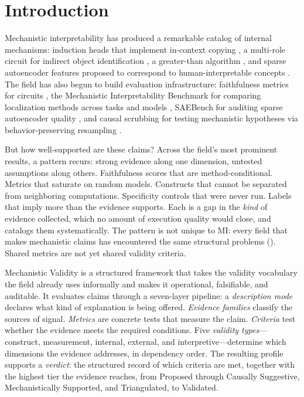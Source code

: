 \documentclass{article}
\begin{document}
\newpage
{\small\setlength{\parskip}{0pt}\setcounter{tocdepth}{3}\tableofcontents}
\newpage

\section{Introduction}
\label{sec:intro}

Mechanistic interpretability has produced a remarkable catalog of internal mechanisms:
induction heads that implement in-context copying \citep{olsson2022context}, a multi-role
circuit for indirect object identification \citep{wang2023interpretability}, a greater-than
algorithm \citep{hanna2023greater}, and sparse autoencoder features proposed to correspond
to human-interpretable concepts \citep{cunningham2024sparse, bricken2023monosemanticity}. The field has also begun to
build evaluation infrastructure: faithfulness metrics for circuits
\citep{miller2024transformer}, the Mechanistic Interpretability Benchmark for comparing
localization methods across tasks and models \citep{mueller2025mib}, SAEBench for auditing
sparse autoencoder quality \citep{karvonen2025saebench}, and causal scrubbing for testing
mechanistic hypotheses via behavior-preserving resampling \citep{chan2022causal}.

But how well-supported are these claims? Across the field's most prominent results, a pattern recurs: strong evidence along one dimension, untested assumptions along others. Faithfulness scores that are method-conditional. Metrics that saturate on random models. Constructs that cannot be separated from neighboring computations. Specificity controls that were never run. Labels that imply more than the evidence supports. Each is a gap in the \emph{kind} of evidence collected, which no amount of execution quality would close, and  catalogs them systematically. The pattern is not unique to MI: every field that makes mechanistic claims has encountered the same structural problems (). Shared metrics are not yet shared validity criteria.

Mechanistic Validity is a structured framework that takes the validity vocabulary the field already uses informally and makes it operational, falsifiable, and auditable. It evaluates claims through a seven-layer pipeline: a \emph{description mode} declares what kind of explanation is being offered. \emph{Evidence families} classify the sources of signal. \emph{Metrics} are concrete tests that measure the claim. \emph{Criteria} test whether the evidence meets the required conditions. Five \emph{validity types}---construct, measurement, internal, external, and interpretive---determine which dimensions the evidence addresses, in dependency order. The resulting profile supports a \emph{verdict}: the structured record of which criteria are met, together with the highest tier the evidence reaches, from Proposed through Causally Suggestive, Mechanistically Supported, and Triangulated, to Validated.
\end{document}
